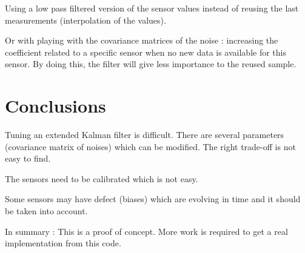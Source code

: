 \documentclass[titlepage,a4,12pt]{article}
\numberwithin{equation}{subsection}
\begin{document}
Using a low pass filtered version of the sensor values instead of reusing the last measurements (interpolation of the values).

Or with playing with the covariance matrices of the noise : increasing the coefficient related to a specific sensor when no new data is available for this sensor. By doing this, the filter will give less importance to the reused sample.

\section{Conclusions}

Tuning an extended Kalman filter is difficult. There are several parameters (covariance matrix of noises) which can be modified. The right trade-off is not easy to find.

The sensors need to be calibrated which is not easy.

Some sensors may have defect (biases) which are evolving in time and it should be taken into account.

In summary : This is a proof of concept. More work is required to get a real implementation from this code.
\end{document}
